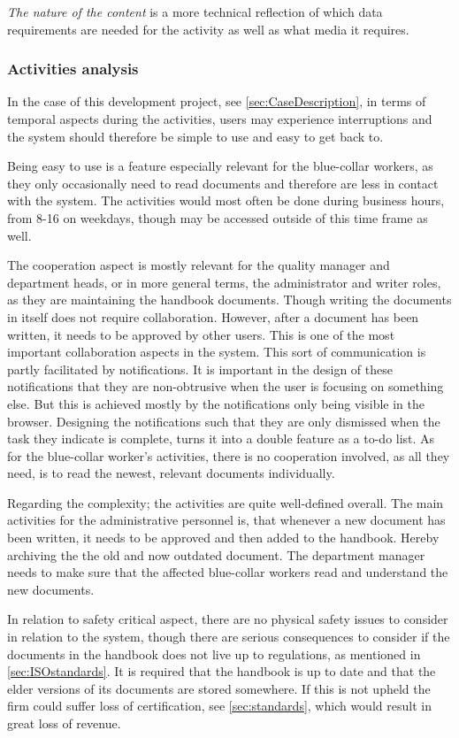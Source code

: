 \textit{The nature of the content} is a more technical reflection of which data requirements are needed for the activity as well as what media it requires.

\subsubsection*{Activities analysis}
In the case of this development project, see \cref{sec:CaseDescription}, in terms of temporal aspects during the activities, users may experience interruptions and the system should therefore be simple to use and easy to get back to.

Being easy to use is a feature especially relevant for the blue-collar workers, as they only occasionally need to read documents and therefore are less in contact with the system.
The activities would most often be done during business hours, from 8-16 on weekdays, though may be accessed outside of this time frame as well.

The cooperation aspect is mostly relevant for the  quality manager and department heads, or in more general terms, the administrator and writer roles, as they are maintaining the handbook documents.
Though writing the documents in itself does not require collaboration.
However, after a document has been written, it needs to be approved by other users.
This is one of the most important collaboration aspects in the system.
This sort of communication is partly facilitated by notifications. 
It is important in the design of these notifications that they are non-obtrusive when the user is focusing on something else. 
But this is achieved mostly by the notifications only being visible in the browser. 
Designing the notifications such that they are only dismissed when the task they indicate is complete, turns it into a double feature as a to-do list.
As for the blue-collar worker's activities, there is no cooperation involved, as all they need, is to read the newest, relevant documents individually.

Regarding the complexity; the activities are quite well-defined overall.
The main activities for the administrative personnel is, that whenever a new document has been written, it needs to be approved and then added to the handbook.
Hereby archiving the the old and now outdated document.
The department manager needs to make sure that the affected blue-collar workers read and understand the new documents.

In relation to safety critical aspect, there are no physical safety issues to consider in relation to the system, though there are serious consequences to consider if the documents in the handbook does not live up to regulations, as mentioned in \cref{sec:ISOstandards}.
It is required that the handbook is up to date and that the elder versions of its documents are stored somewhere.
If this is not upheld the firm could suffer loss of certification, see \cref{sec:standards}, which would result in great loss of revenue.

